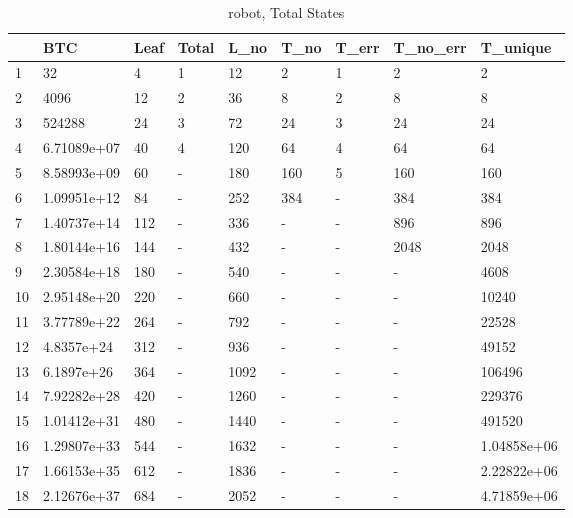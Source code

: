 \begin{table}
\centering
\caption{robot, Total States}
\label{robot_total}
\begin{tabular}{lllllllll}
\toprule
{} &          BTC &  Leaf & Total &  L\_no & T\_no & T\_err & T\_no\_err &     T\_unique \\
\midrule
1  &           32 &     4 &     1 &    12 &    2 &     1 &        2 &            2 \\
2  &         4096 &    12 &     2 &    36 &    8 &     2 &        8 &            8 \\
3  &       524288 &    24 &     3 &    72 &   24 &     3 &       24 &           24 \\
4  &  6.71089e+07 &    40 &     4 &   120 &   64 &     4 &       64 &           64 \\
5  &  8.58993e+09 &    60 &     - &   180 &  160 &     5 &      160 &          160 \\
6  &  1.09951e+12 &    84 &     - &   252 &  384 &     - &      384 &          384 \\
7  &  1.40737e+14 &   112 &     - &   336 &    - &     - &      896 &          896 \\
8  &  1.80144e+16 &   144 &     - &   432 &    - &     - &     2048 &         2048 \\
9  &  2.30584e+18 &   180 &     - &   540 &    - &     - &        - &         4608 \\
10 &  2.95148e+20 &   220 &     - &   660 &    - &     - &        - &        10240 \\
11 &  3.77789e+22 &   264 &     - &   792 &    - &     - &        - &        22528 \\
12 &   4.8357e+24 &   312 &     - &   936 &    - &     - &        - &        49152 \\
13 &   6.1897e+26 &   364 &     - &  1092 &    - &     - &        - &       106496 \\
14 &  7.92282e+28 &   420 &     - &  1260 &    - &     - &        - &       229376 \\
15 &  1.01412e+31 &   480 &     - &  1440 &    - &     - &        - &       491520 \\
16 &  1.29807e+33 &   544 &     - &  1632 &    - &     - &        - &  1.04858e+06 \\
17 &  1.66153e+35 &   612 &     - &  1836 &    - &     - &        - &  2.22822e+06 \\
18 &  2.12676e+37 &   684 &     - &  2052 &    - &     - &        - &  4.71859e+06 \\

\end{tabular}
\end{table}
